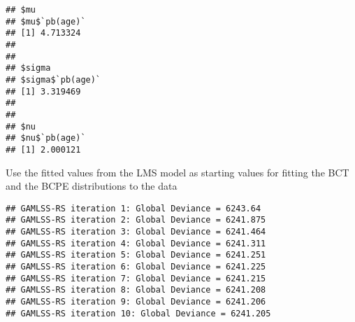 \begin{verbatim}
## $mu
## $mu$`pb(age)`
## [1] 4.713324
## 
## 
## $sigma
## $sigma$`pb(age)`
## [1] 3.319469
## 
## 
## $nu
## $nu$`pb(age)`
## [1] 2.000121
\end{verbatim}

Use the fitted values from the LMS model as starting values for fitting
the BCT and the BCPE distributions to the data

\begin{Shaded}
\begin{Highlighting}[]
\OtherTok{\textless{}{-}} \SpecialCharTok{\textasciitilde{}} 
                \SpecialCharTok{\textasciitilde{}} 
                \SpecialCharTok{\textasciitilde{}} 
                \SpecialCharTok{\textasciitilde{}} 
\end{Highlighting}
\end{Shaded}

\begin{verbatim}
## GAMLSS-RS iteration 1: Global Deviance = 6243.64 
## GAMLSS-RS iteration 2: Global Deviance = 6241.875 
## GAMLSS-RS iteration 3: Global Deviance = 6241.464 
## GAMLSS-RS iteration 4: Global Deviance = 6241.311 
## GAMLSS-RS iteration 5: Global Deviance = 6241.251 
## GAMLSS-RS iteration 6: Global Deviance = 6241.225 
## GAMLSS-RS iteration 7: Global Deviance = 6241.215 
## GAMLSS-RS iteration 8: Global Deviance = 6241.208 
## GAMLSS-RS iteration 9: Global Deviance = 6241.206 
## GAMLSS-RS iteration 10: Global Deviance = 6241.205
\end{verbatim}

\begin{Shaded}
\begin{Highlighting}[]
\OtherTok{\textless{}{-}} \SpecialCharTok{\textasciitilde{}} 
                 \SpecialCharTok{\textasciitilde{}} 
                 \SpecialCharTok{\textasciitilde{}} 
                 \SpecialCharTok{\textasciitilde{}} 
\end{Highlighting}
\end{Shaded}

